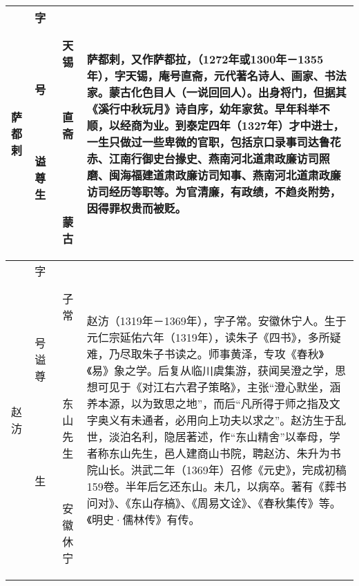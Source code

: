 \begin{longtable}{|>{\centering\namefont\heiti}m{2em}|>{\centering\tiny}m{3.0em}|>{\xzfont\kaiti}m{7em}|}
 萨都剌 & \begin{description}
 \item[字] 天锡
 \item[号] 直斋
 \item[谥] 
 \item[尊] 
 \item[生] 蒙古
 \end{description} & 萨都剌，又作萨都拉，（1272年或1300年－1355年），字天锡，庵号直斋，元代著名诗人、画家、书法家。蒙古化色目人（一说回回人）。出身将门，但据其《溪行中秋玩月》诗自序，幼年家贫。早年科举不顺，以经商为业。到泰定四年（1327年）才中进士，一生只做过一些卑微的官职，包括京口录事司达鲁花赤、江南行御史台掾史、燕南河北道肃政廉访司照磨、闽海福建道肃政廉访司知事、燕南河北道肃政廉访司经历等职等。为官清廉，有政绩，不趋炎附势，因得罪权贵而被贬。 \tabularnewline\hline
 赵汸 & \begin{description}
 \item[字] 子常
 \item[号] 
 \item[谥] 
 \item[尊] 东山先生
 \item[生] 安徽休宁
 \end{description} & 赵汸（1319年－1369年），字子常。安徽休宁人。生于元仁宗延佑六年（1319年），读朱子《四书》，多所疑难，乃尽取朱子书读之。师事黄泽，专攻《春秋》《易》象之学。后复从临川虞集游，获闻吴澄之学，思想可见于《对江右六君子策略》，主张“澄心默坐，涵养本源，以为致思之地”，而后“凡所得于师之指及文字奥义有未通者，必用向上功夫以求之”。赵汸生于乱世，淡泊名利，隐居著述，作“东山精舍”以奉母，学者称东山先生，邑人建商山书院，聘赵汸、朱升为书院山长。洪武二年（1369年）召修《元史》，完成初稿159卷。半年后乞还东山。未几，以病卒。著有《葬书问对》、《东山存槁》、《周易文诠》、《春秋集传》等。《明史·儒林传》有传。 \tabularnewline
 \bottomrule
\end{longtable}


